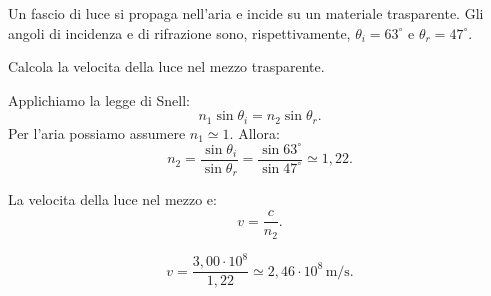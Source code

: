 
\begin{esercizio}
Un fascio di luce si propaga nell'aria e incide su un materiale trasparente.
Gli angoli di incidenza e di rifrazione sono, rispettivamente,
\(\theta_i=63^\circ\) e \(\theta_r=47^\circ\).

Calcola la velocita della luce nel mezzo trasparente.
\end{esercizio}

\begin{soluzione}
Applichiamo la legge di Snell:
\[
n_1\sin\theta_i=n_2\sin\theta_r.
\]
Per l'aria possiamo assumere \(n_1\simeq 1\). Allora:
\[
n_2=\frac{\sin\theta_i}{\sin\theta_r}
=\frac{\sin 63^\circ}{\sin 47^\circ}
\simeq 1{,}22.
\]

La velocita della luce nel mezzo e:
\[
v=\frac{c}{n_2}.
\]

\[
v=\frac{3{,}00\cdot 10^8}{1{,}22}
\simeq 2{,}46\cdot 10^8\,\mathrm{m/s}.
\]
\end{soluzione}
